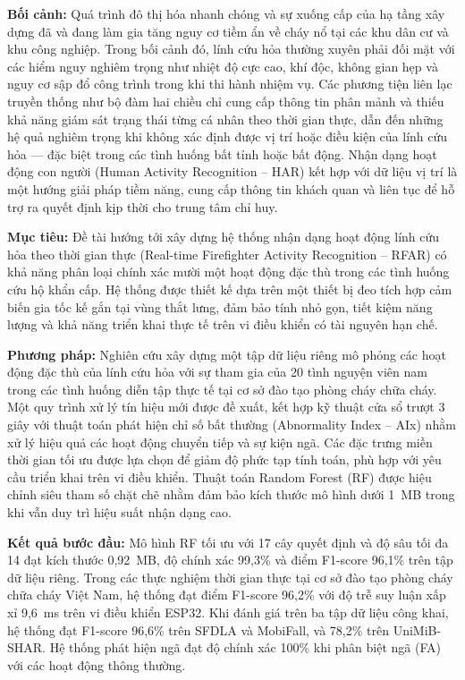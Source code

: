 \label{abstract}

\textbf{Bối cảnh:} Quá trình đô thị hóa nhanh chóng và sự xuống cấp của hạ tầng xây dựng đã và đang làm gia tăng nguy cơ tiềm ẩn về cháy nổ tại các khu dân cư và khu công nghiệp. Trong bối cảnh đó, lính cứu hỏa thường xuyên phải đối mặt với các hiểm nguy nghiêm trọng như nhiệt độ cực cao, khí độc, không gian hẹp và nguy cơ sập đổ công trình trong khi thi hành nhiệm vụ. Các phương tiện liên lạc truyền thống như bộ đàm hai chiều chỉ cung cấp thông tin phân mảnh và thiếu khả năng giám sát trạng thái từng cá nhân theo thời gian thực, dẫn đến những hệ quả nghiêm trọng khi không xác định được vị trí hoặc điều kiện của lính cứu hỏa — đặc biệt trong các tình huống bất tỉnh hoặc bất động. Nhận dạng hoạt động con người (Human Activity Recognition -- HAR) kết hợp với dữ liệu vị trí là một hướng giải pháp tiềm năng, cung cấp thông tin khách quan và liên tục để hỗ trợ ra quyết định kịp thời cho trung tâm chỉ huy.

\textbf{Mục tiêu:} Đề tài hướng tới xây dựng hệ thống nhận dạng hoạt động lính cứu hỏa theo thời gian thực (Real-time Firefighter Activity Recognition -- RFAR) có khả năng phân loại chính xác mười một hoạt động đặc thù trong các tình huống cứu hộ khẩn cấp. Hệ thống được thiết kế dựa trên một thiết bị đeo tích hợp cảm biến gia tốc kế gắn tại vùng thắt lưng, đảm bảo tính nhỏ gọn, tiết kiệm năng lượng và khả năng triển khai thực tế trên vi điều khiển có tài nguyên hạn chế.

\textbf{Phương pháp:} Nghiên cứu xây dựng một tập dữ liệu riêng mô phỏng các hoạt động đặc thù của lính cứu hỏa với sự tham gia của 20 tình nguyện viên nam trong các tình huống diễn tập thực tế tại cơ sở đào tạo phòng cháy chữa cháy. Một quy trình xử lý tín hiệu mới được đề xuất, kết hợp kỹ thuật cửa sổ trượt 3 giây với thuật toán phát hiện chỉ số bất thường (Abnormality Index -- AIx) nhằm xử lý hiệu quả các hoạt động chuyển tiếp và sự kiện ngã. Các đặc trưng miền thời gian tối ưu được lựa chọn để giảm độ phức tạp tính toán, phù hợp với yêu cầu triển khai trên vi điều khiển. Thuật toán Random Forest (RF) được hiệu chỉnh siêu tham số chặt chẽ nhằm đảm bảo kích thước mô hình dưới 1~MB trong khi vẫn duy trì hiệu suất nhận dạng cao.

\textbf{Kết quả bước đầu:} Mô hình RF tối ưu với 17 cây quyết định và độ sâu tối đa 14 đạt kích thước 0,92~MB, độ chính xác 99,3\% và điểm F1-score 96,1\% trên tập dữ liệu riêng. Trong các thực nghiệm thời gian thực tại cơ sở đào tạo phòng cháy chữa cháy Việt Nam, hệ thống đạt điểm F1-score 96,2\% với độ trễ suy luận xấp xỉ 9,6~ms trên vi điều khiển ESP32. Khi đánh giá trên ba tập dữ liệu công khai, hệ thống đạt F1-score 96,6\% trên SFDLA và MobiFall, và 78,2\% trên UniMiB-SHAR. Hệ thống phát hiện ngã đạt độ chính xác 100\% khi phân biệt ngã (FA) với các hoạt động thông thường.

